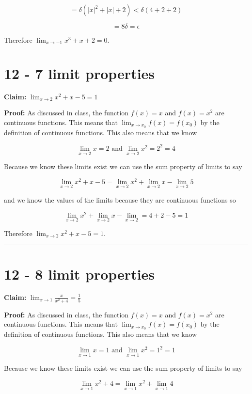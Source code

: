 \documentclass[10pt,letterpaper]{article}
\newcommand\ds{\displaystyle}
\newcommand\qedsym{\hfill \rule{2mm}{2mm}}
\begin{document}
\[=\delta (|x|^2 + |x| + 2) < \delta (4 + 2 + 2)\]

\[= 8\delta = \epsilon\]

Therefore $\ds\lim_{x\to -1} x^3 + x + 2 = 0$.

\section*{12 - 7 limit properties}

\textbf{Claim:} $\ds\lim_{x\to 2} x^2 + x - 5 = 1$

\medskip

\textbf{Proof:} As discussed in class, the function $f(x) = x$ and $f(x) = x^2$ are continuous functions. This means that $\ds\lim_{x\to x_0} f(x) = f(x_0)$ by the definition of continuous functions. This also means that we know

\[\lim_{x\to 2} x = 2 \text{ and } \lim_{x\to 2} x^2 = 2^2 = 4\]

Because we know these limits exist we can use the sum property of limits to say

\[\ds\lim_{x\to 2} x^2 + x - 5 = \lim_{x\to 2}x^2 + \lim_{x\to 2} x - \lim_{x\to 2} 5\]

and we know the values of the limits because they are continuous functions so

\[\lim_{x\to 2}x^2 + \lim_{x\to 2} x - \lim_{x\to 2} = 4 + 2 - 5 = 1\]

Therefore $\ds\lim_{x\to 2} x^2 + x - 5 = 1$.

\qedsym

\section*{12 - 8 limit properties}

\textbf{Claim:} $\ds\lim_{x\to 1} \frac{x}{x^2 + 4} = \frac{1}{5}$

\medskip

\textbf{Proof:} As discussed in class, the function $f(x) = x$ and $f(x) = x^2$ are continuous functions. This means that $\ds\lim_{x\to x_0} f(x) = f(x_0)$ by the definition of continuous functions. This also means that we know

\[\lim_{x\to 1} x = 1 \text{ and } \lim_{x\to 1} x^2 = 1^2 = 1\]

Because we know these limits exist we can use the sum property of limits to say

\[\lim_{x\to 1}x^2+4 = \lim_{x\to 1}x^2 + \lim_{x\to 1} 4\]
\end{document}
